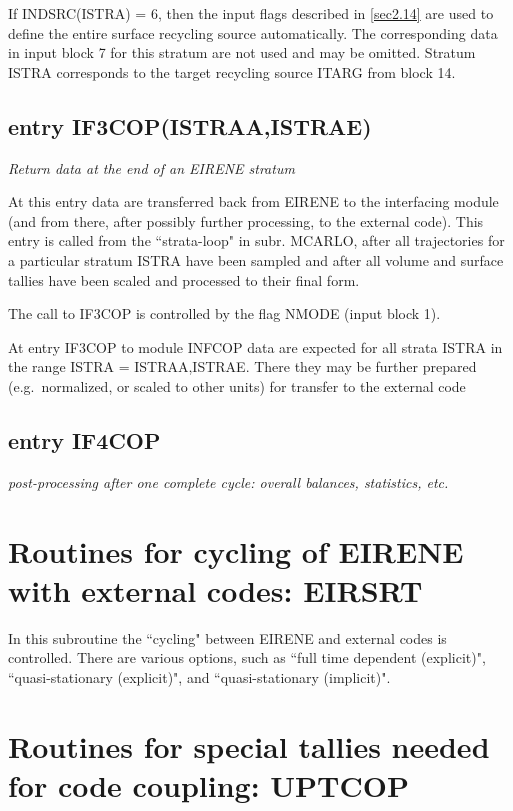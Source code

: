 \medskip

If INDSRC(ISTRA) = 6, then the input flags described in \cref{sec2.14} are used
to define the entire surface recycling source automatically.
The corresponding data in input block 7 for this stratum are not used and may
be omitted.
Stratum ISTRA corresponds to the target recycling source ITARG from block 14.

\subsection{entry IF3COP(ISTRAA,ISTRAE)}  \label{sec4.1.3}

\textsl{Return data at the end of an EIRENE stratum}

\medskip

At this entry data are transferred back from EIRENE to the interfacing module
(and from there, after possibly further processing, to the external code).
This entry is called from the ``strata-loop" in subr.
MCARLO, after all trajectories for a particular stratum ISTRA have been sampled
and after all volume and surface tallies have been scaled and processed to
their final form.

The call to IF3COP is controlled by the flag NMODE (input block 1).

At entry IF3COP to module INFCOP data are expected for all strata ISTRA in the
range ISTRA = ISTRAA,ISTRAE.
There they may be further prepared (e.g.\ normalized, or scaled to other units)
for transfer to the external code 

\subsection{entry IF4COP} \label{sec4.1.4} 

\textsl{post-processing after one complete cycle: overall balances, statistics, etc.} 

\section{Routines for cycling of EIRENE with external codes: EIRSRT}
\label{sec4.2} 

In this subroutine the ``cycling" between EIRENE and external codes is
controlled.
There are various options, such as ``full time dependent (explicit)",
``quasi-stationary (explicit)", and ``quasi-stationary (implicit)".

\section{Routines for special tallies needed for code coupling: UPTCOP}
\label{sec4.3}

